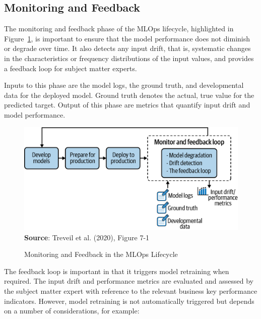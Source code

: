 \subsection{Monitoring and Feedback}

The monitoring and feedback phase of the MLOps lifecycle, highlighted in Figure~\ref{fig:monitoringfeedback}, is important to ensure that the model performance does not diminish or degrade over time. It also detects any input drift, that is, systematic changes in the characteristics or frequency distributions of the input values, and provides a feedback loop for subject matter experts.

Inputs to this phase are the model logs, the ground truth, and developmental data for the deployed model. Ground truth denotes the actual, true value for the predicted target. Output of this phase are metrics that quantify input drift and model performance. 

\begin{figure}
\centering
\includegraphics[width=.75\textwidth]{imlo_0701.png} \\

\vspace{\baselineskip}
\scriptsize \textbf{Source}: Treveil et al. (2020), Figure 7-1
\caption{Monitoring and Feedback in the MLOps Lifecycle}
\label{fig:monitoringfeedback}
\end{figure}

The feedback loop is important in that it triggers model retraining when required. The input drift and performance metrics are evaluated and assessed by the subject matter expert with reference to the relevant business key performance indicators. However, model retraining is not automatically triggered but depends on a number of considerations, for example:

